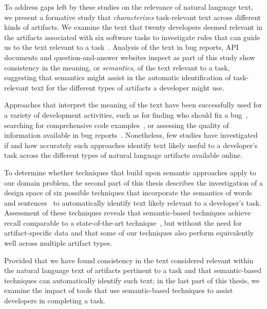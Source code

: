 To address gaps left by these studies on the relevance of natural language text,
we present a formative study that \textit{characterizes} task-relevant text 
across different kinds of artifacts. 
We examine the text that twenty developers deemed relevant in the  artifacts  associated with six software tasks to investigate 
rules that can guide us to the text relevant to a task~\cite{Kintsch1978a}.
Analysis of the  text  in bug
reports, API documents and question-and-answer websites 
inspect as part of this study 
 show consistency in the meaning, or \textit{semantics}, of the
 text relevant to a task, suggesting that 
semantics might assist in the automatic identification of
task-relevant text for the different types of artifacts a developer 
might use.







Approaches that interpret the meaning of the text have been successfully used for a variety of development activities,
such as for finding who should fix a bug~\cite{yang2016}, searching for comprehensive code examples~\cite{silva2019}, or assessing the quality of information available in bug reports~\cite{chaparro2019}.
Nonetheless, few studies have investigated if and how accurately such approaches identify
text likely 
useful to a developer's task across the different types of natural language artifacts available online.


To determine whether
techniques that build upon semantic approaches 
apply to our domain problem,
the second part of this thesis describes 
the investigation of a design space
of six possible techniques that incorporate the semantics of words~\cite{Mikolov2013, Devlin2018Bert}
and sentences~\cite{fillmore1976frame, marques2021}
to automatically identify text likely relevant to a developer's task.
Assessment of these techniques reveals that semantic-based techniques
achieve recall comparable to a state-of-the-art technique~\cite{Xu2017}, but without the need for artifact-specific data
and that some of our techniques also perform equivalently well across
multiple artifact types.






Provided that we have found consistency in the text considered relevant within the natural language text of artifacts pertinent to a task and that semantic-based techniques can automatically identify such text; in the last part of this thesis, we examine the impact of tools that use semantic-based techniques to assist developers in 
completing a task. 



